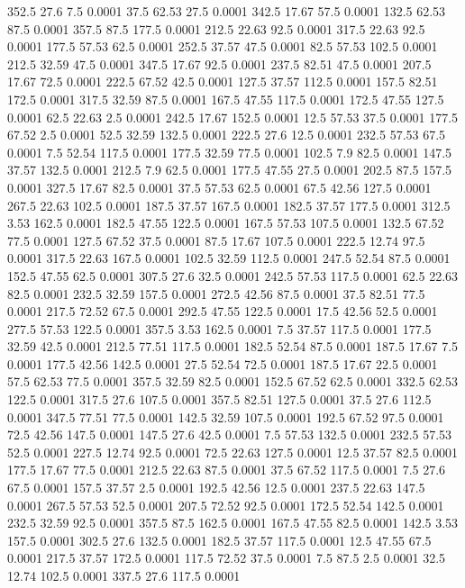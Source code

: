 352.5	27.6	7.5	0.0001
37.5	62.53	27.5	0.0001
342.5	17.67	57.5	0.0001
132.5	62.53	87.5	0.0001
357.5	87.5	177.5	0.0001
212.5	22.63	92.5	0.0001
317.5	22.63	92.5	0.0001
177.5	57.53	62.5	0.0001
252.5	37.57	47.5	0.0001
82.5	57.53	102.5	0.0001
212.5	32.59	47.5	0.0001
347.5	17.67	92.5	0.0001
237.5	82.51	47.5	0.0001
207.5	17.67	72.5	0.0001
222.5	67.52	42.5	0.0001
127.5	37.57	112.5	0.0001
157.5	82.51	172.5	0.0001
317.5	32.59	87.5	0.0001
167.5	47.55	117.5	0.0001
172.5	47.55	127.5	0.0001
62.5	22.63	2.5	0.0001
242.5	17.67	152.5	0.0001
12.5	57.53	37.5	0.0001
177.5	67.52	2.5	0.0001
52.5	32.59	132.5	0.0001
222.5	27.6	12.5	0.0001
232.5	57.53	67.5	0.0001
7.5	52.54	117.5	0.0001
177.5	32.59	77.5	0.0001
102.5	7.9	82.5	0.0001
147.5	37.57	132.5	0.0001
212.5	7.9	62.5	0.0001
177.5	47.55	27.5	0.0001
202.5	87.5	157.5	0.0001
327.5	17.67	82.5	0.0001
37.5	57.53	62.5	0.0001
67.5	42.56	127.5	0.0001
267.5	22.63	102.5	0.0001
187.5	37.57	167.5	0.0001
182.5	37.57	177.5	0.0001
312.5	3.53	162.5	0.0001
182.5	47.55	122.5	0.0001
167.5	57.53	107.5	0.0001
132.5	67.52	77.5	0.0001
127.5	67.52	37.5	0.0001
87.5	17.67	107.5	0.0001
222.5	12.74	97.5	0.0001
317.5	22.63	167.5	0.0001
102.5	32.59	112.5	0.0001
247.5	52.54	87.5	0.0001
152.5	47.55	62.5	0.0001
307.5	27.6	32.5	0.0001
242.5	57.53	117.5	0.0001
62.5	22.63	82.5	0.0001
232.5	32.59	157.5	0.0001
272.5	42.56	87.5	0.0001
37.5	82.51	77.5	0.0001
217.5	72.52	67.5	0.0001
292.5	47.55	122.5	0.0001
17.5	42.56	52.5	0.0001
277.5	57.53	122.5	0.0001
357.5	3.53	162.5	0.0001
7.5	37.57	117.5	0.0001
177.5	32.59	42.5	0.0001
212.5	77.51	117.5	0.0001
182.5	52.54	87.5	0.0001
187.5	17.67	7.5	0.0001
177.5	42.56	142.5	0.0001
27.5	52.54	72.5	0.0001
187.5	17.67	22.5	0.0001
57.5	62.53	77.5	0.0001
357.5	32.59	82.5	0.0001
152.5	67.52	62.5	0.0001
332.5	62.53	122.5	0.0001
317.5	27.6	107.5	0.0001
357.5	82.51	127.5	0.0001
37.5	27.6	112.5	0.0001
347.5	77.51	77.5	0.0001
142.5	32.59	107.5	0.0001
192.5	67.52	97.5	0.0001
72.5	42.56	147.5	0.0001
147.5	27.6	42.5	0.0001
7.5	57.53	132.5	0.0001
232.5	57.53	52.5	0.0001
227.5	12.74	92.5	0.0001
72.5	22.63	127.5	0.0001
12.5	37.57	82.5	0.0001
177.5	17.67	77.5	0.0001
212.5	22.63	87.5	0.0001
37.5	67.52	117.5	0.0001
7.5	27.6	67.5	0.0001
157.5	37.57	2.5	0.0001
192.5	42.56	12.5	0.0001
237.5	22.63	147.5	0.0001
267.5	57.53	52.5	0.0001
207.5	72.52	92.5	0.0001
172.5	52.54	142.5	0.0001
232.5	32.59	92.5	0.0001
357.5	87.5	162.5	0.0001
167.5	47.55	82.5	0.0001
142.5	3.53	157.5	0.0001
302.5	27.6	132.5	0.0001
182.5	37.57	117.5	0.0001
12.5	47.55	67.5	0.0001
217.5	37.57	172.5	0.0001
117.5	72.52	37.5	0.0001
7.5	87.5	2.5	0.0001
32.5	12.74	102.5	0.0001
337.5	27.6	117.5	0.0001
